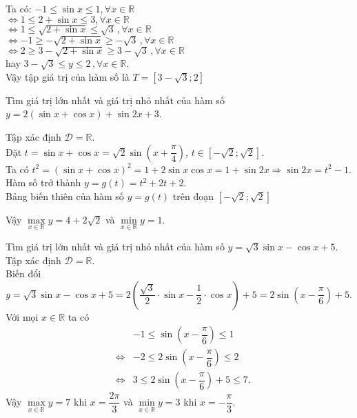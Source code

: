 \begin{ex}
{		Ta có: $-1\le \sin x\le 1,\forall x\in \mathbb{R}$\\
		$\Leftrightarrow 1\le 2+\sin x\le 3,\forall x\in \mathbb{R}$\\
		$\Leftrightarrow 1\le \sqrt{2+\sin x}\le \sqrt{3}\,,\forall x\in \mathbb{R}$\\
		$\Leftrightarrow -1\ge -\sqrt{2+\sin x}\ge -\sqrt{3}\,,\forall x\in \mathbb{R}$\\
		$\Leftrightarrow 2\ge 3-\sqrt{2+\sin x}\ge 3-\sqrt{3}\,,\forall x\in \mathbb{R}$\\
		hay $3-\sqrt{3}\le y\le 2\,,\forall x\in \mathbb{R}$.\\
		Vậy tập giá trị của hàm số là $T=\left[3-\sqrt{3};2\right]$
	}
\end{ex}

\begin{ex}%
	Tìm giá trị lớn nhất và giá trị nhỏ nhất của hàm số  $y=2(\sin x+\cos x)+\sin 2 x+3$.
	\loigiai
	{Tập xác định $\mathscr{D}=\mathbb{R}$.\\
		Đặt $t=\sin x+ \cos x=\sqrt{2}\sin \left(x+\dfrac{\pi}{4}\right)$, $t\in \left[-\sqrt{2};\sqrt{2}\right]$.\\
		Ta có $t^2=\left(\sin x+ \cos x\right)^2=1+2\sin x\cos x=1+\sin 2x\Rightarrow \sin 2x =t^2-1$.\\
		Hàm số trở thành $y=g(t)=t^2+2t+2$. \\
		Bảng biến thiên của hàm số $y=g(t)$ trên đoạn $ \left[-\sqrt{2};\sqrt{2}\right]$
		\begin{center}
		\end{center}
		Vậy $\max\limits_{x \in \mathbb{R}} y=4+2\sqrt{2}$ và $\min\limits_{x \in \mathbb{R}} y=1$.
	}
\end{ex}

\begin{ex}%
	Tìm giá trị lớn nhất và giá trị nhỏ nhất của hàm số $y=\sqrt{3} \sin x-\cos x+5$.
	\loigiai
	{
		Tập xác định $\mathscr{D}=\mathbb{R}$.\\
		Biến đổi $y=\sqrt{3} \sin x-\cos x+5=2\left(\dfrac{\sqrt{3}}{2}\cdot\sin x-\dfrac{1}{2}\cdot\cos x\right)+5=2\sin\left(x-\dfrac{\pi}{6}\right)+5$.\\
		Với mọi $x\in \mathbb{R}$ ta có
		\allowdisplaybreaks
		\begin{eqnarray*}
			& & -1\leq \sin\left(x-\dfrac{\pi}{6}\right)\leq 1\\
			&\Leftrightarrow& -2\leq 2\sin\left(x-\dfrac{\pi}{6}\right)\leq 2\\
			&\Leftrightarrow&3\leq  2\sin\left(x-\dfrac{\pi}{6}\right)+5\leq 7.
		\end{eqnarray*}
		Vậy $\max\limits_{x \in \mathbb{R}} y=7$ khi $x=\dfrac{2\pi}{3}$ và $\min\limits_{x \in \mathbb{R}} y=3$ khi $x=-\dfrac{\pi}{3}$.
	}
\end{ex}
